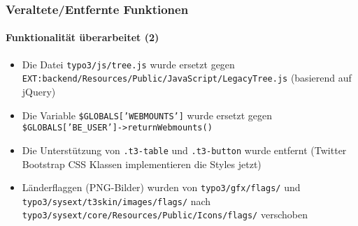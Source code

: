 \begin{frame}[fragile]
	\frametitle{Veraltete/Entfernte Funktionen}
	\framesubtitle{Funktionalität überarbeitet (2)}

	\begin{itemize}

		\item Die Datei
			\small\texttt{typo3/js/tree.js}\normalsize\space
			wurde ersetzt gegen
			\small\texttt{EXT:backend/Resources/Public/JavaScript/LegacyTree.js}\normalsize\newline
			(basierend auf jQuery)

		\item Die Variable
			\small\texttt{\$GLOBALS['WEBMOUNTS']}\normalsize\space
			wurde ersetzt gegen
			\small\texttt{\$GLOBALS['BE\_USER']->returnWebmounts()}\normalsize

		\item Die Unterstützung von
			\small\texttt{.t3-table}\normalsize\space
			und
			\small\texttt{.t3-button}\normalsize\space
			wurde entfernt\newline
			\small
				(Twitter Bootstrap CSS Klassen implementieren die Styles jetzt)
			\normalsize

		\item Länderflaggen (PNG-Bilder) wurden von
			\small\texttt{typo3/gfx/flags/}\normalsize\space
			und
			\small\texttt{typo3/sysext/t3skin/images/flags/}\normalsize\space
			nach
			\small\texttt{typo3/sysext/core/Resources/Public/Icons/flags/}\normalsize\space
			verschoben

	\end{itemize}

\end{frame}


